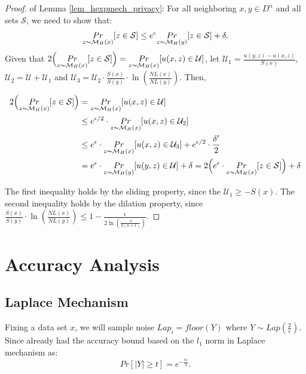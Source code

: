 \begin{proof}
of Lemma \ref{lem_hexpmech_privacy}: For all neighboring $x, y \in D^n$ and all sets $\mathcal{S}$, we need to show that:
\begin{equation*}
\underset{z \thicksim \mathcal{M}_H(x)}{Pr}[ z \in \mathcal{S}] \leq e^{\epsilon} \underset{z \thicksim \mathcal{M}_H(y)}{Pr}[z \in \mathcal{S}] + \delta. 
\end{equation*}
Given that $2\Big( \underset{z \thicksim \mathcal{M}_H(x)}{Pr}[ z \in \mathcal{S}]\Big) = \underset{z \thicksim \mathcal{M}_H(x)}{Pr}[ u(x,z) \in \mathcal{U}]$, let $\mathcal{U}_1 = \frac{u(y,z) - u(x,z)}{S(x)}$, $\mathcal{U}_2 = \mathcal{U} + \mathcal{U}_1$ and $\mathcal{U}_3 = \mathcal{U}_2 \cdot \frac{S(x)}{S(y)} \cdot \ln(\frac{NL(x)}{NL(y)})$. Then,

\begin{equation*}
\begin{split}
2\Big( \underset{z \thicksim \mathcal{M}_H(x)}{Pr}[ z \in \mathcal{S}]\Big)
& = \underset{z \thicksim \mathcal{M}_H(x)}{Pr}[ u(x,z) \in \mathcal{U}]\\
& \leq e^{\epsilon / 2} \cdot \underset{z \thicksim \mathcal{M}_H(x)}{Pr}[ u(x,z) \in \mathcal{U}_2]\\
& \leq e^{\epsilon} \cdot \underset{z \thicksim \mathcal{M}_H(x)}{Pr}[ u(x,z) \in \mathcal{U}_3] + e^{\epsilon/2} \cdot \frac{\delta'}{2}\\
& = e^{\epsilon} \cdot \underset{z \thicksim \mathcal{M}_H(y)}{Pr}[ u(y,z) \in \mathcal{U}] + \delta = 2\Big( e^{\epsilon} \cdot \underset{z \thicksim \mathcal{M}_H(x)}{Pr}[ z \in \mathcal{S}] \Big) + \delta\\
\end{split}
\end{equation*}

The first inequality holds by the sliding property, since the $\mathcal{U}_1 \geq -S(x)$. The second inequality holds by the dilation property, since $\frac{S(x)}{S(y)} \cdot \ln(\frac{NL(x)}{NL(y)}) \leq 1 - \frac{\epsilon}{2 \ln (\frac{\delta}{2 (n + 1)})}$.

\end{proof}

\section{Accuracy Analysis}
\subsection{Laplace Mechanism}
Fixing a data set $x$, we will sample noise $Lap_i = floor(Y)$ where $Y \sim Lap(\frac{2}{\epsilon})$. Since already had the accuracy bound based on the $l_1$ norm in Laplace mechanism as:
\begin{equation*}
Pr[|Y| \geq t] = e^{- \frac{t \epsilon}{2}}.
\end{equation*}

